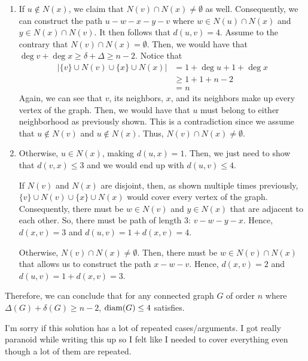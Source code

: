 \begin{solution}
\begin{enumerate}
      \begin{enumerate}
        \item If \(u \notin N(x)\), we claim that \(N(v) \cap
          N(x) \neq \emptyset\) as well. Consequently, we can construct the
          path \(u - w - x - y - v\) where \(w \in N(u) \cap N(x)\) and \(y \in N(x)
          \cap N(v)\). It then follows that \(d(u, v) = 4\).
          Assume to the contrary that \(N(v) \cap N(x) = \emptyset\).
          Then, we would have that \(\deg v + \deg x \geq \delta + \Delta \geq
          n-2\). Notice that
          \[
            \begin{aligned}
              \left|\{v\} \cup N(v) \cup \{x\} \cup N(x)\right|
                &= 1 + \deg u + 1 + \deg x \\
                &\geq 1 + 1 + n-2 \\
                &= n
            \end{aligned}
          \]
          Again, we can see that \(v\), its neighbors, \(x\), and its neighbors
          make up every vertex of the graph. Then, we would have that \(u\) must
          belong to either neighborhood as previously shown. This is a
          contradiction since we assume that \(u \notin N(v)\) and \(u \notin
          N(x)\). Thus, \(N(v) \cap N(x) \neq \emptyset\).

        \item Otherwise, \(u \in N(x)\), making \(d(u, x) = 1\).
          Then, we just need to show that \(d(v,
          x) \leq 3\) and we would end up with \(d(u, v) \leq 4\).

          If \(N(v)\) and \(N(x)\) are disjoint, then, as shown multiple times
          previously, \(\{v\} \cup N(v) \cup \{x\} \cup N(x)\) would cover every
          vertex of the graph. Consequently, there must be \(w \in N(v)\) and
          \(y \in N(x)\) that are adjacent to each other. So, there must be path
          of length 3: \(v-w-y-x\). Hence, \(d(x, v) = 3\) and \(d(u, v) = 1 +
          d(x, v) = 4\).

          Otherwise, \(N(v) \cap N(x) \neq \emptyset\). Then, there must be \(w
          \in N(v) \cap N(x)\) that allows us to construct the path \(x-w-v\).
          Hence, \(d(x, v) = 2\) and \(d(u, v) = 1 + d(x, v) = 3\).
      \end{enumerate}
  \end{enumerate}

  Therefore, we can conclude that for any connected graph \(G\)
  of order \(n\) where \(\Delta(G) + \delta(G) \geq n-2\),
  \(\operatorname{diam}(G) \leq 4\) satisfies. 

  I'm sorry if this solution has a lot of repeated cases/arguments. I got really
  paranoid while writing this up so I felt like I needed to cover everything
  even though a lot of them are repeated.
\end{solution}
